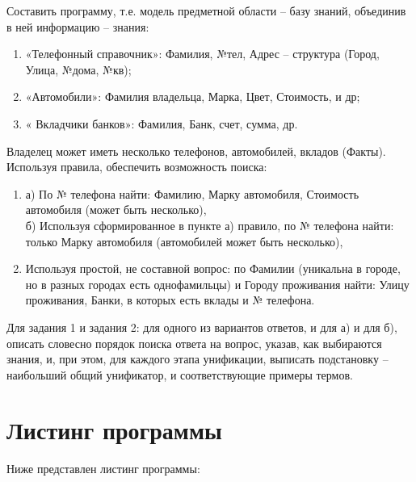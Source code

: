 \Large Составить программу, т.е. модель предметной области – базу знаний, объединив в ней информацию – знания:
\begin{enumerate}

	\item «Телефонный справочник»: Фамилия, №тел, Адрес – структура (Город, Улица, №дома, №кв);
	\item «Автомобили»: Фамилия владельца, Марка, Цвет, Стоимость, и др;
	\item « Вкладчики банков»: Фамилия, Банк, счет, сумма, др.
\end{enumerate}
Владелец может иметь несколько телефонов, автомобилей, вкладов (Факты).
Используя правила, обеспечить возможность поиска:
\begin{enumerate}
\item	а) По № телефона найти: Фамилию, Марку автомобиля, Стоимость автомобиля (может быть несколько),
\\б) Используя сформированное в пункте а) правило, по № телефона найти: только Марку автомобиля (автомобилей может быть несколько),
\item	Используя простой, не составной вопрос: по Фамилии (уникальна в городе, но в разных городах есть однофамильцы) и Городу проживания найти:  Улицу проживания, Банки, в которых есть вклады и № телефона.
\end{enumerate}
Для задания 1 и задания 2: 
для одного из вариантов ответов, и для а) и для б), описать словесно порядок поиска ответа на вопрос, указав, как выбираются знания, и, при этом, для каждого этапа унификации, выписать подстановку – наибольший общий унификатор, и соответствующие примеры термов.

\newpage
\section*{Листинг программы}
Ниже представлен листинг программы:


